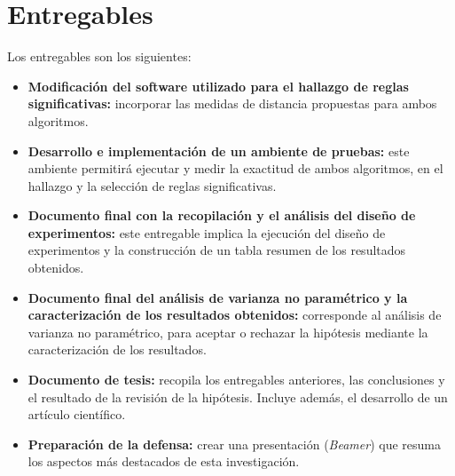 \section{\textbf{Entregables}}
Los entregables son los siguientes:
\begin{itemize}
\item \textbf{Modificaci\'on del software utilizado para el hallazgo de reglas significativas:} incorporar las medidas de distancia propuestas para ambos algoritmos.
\item \textbf{Desarrollo e implementaci\'on de un ambiente de pruebas:} este ambiente permitir\'a ejecutar y medir la exactitud de ambos algoritmos, en el hallazgo y la selecci\'on de reglas significativas.
\item \textbf{Documento final con la recopilaci\'on y el an\'alisis del dise\~no de experimentos:} este entregable implica la ejecuci\'on del dise\~no de experimentos y la construcci\'on de un tabla resumen de los resultados obtenidos. 
\item \textbf{Documento final del an\'alisis de varianza no param\'etrico y la caracterizaci\'on de los resultados obtenidos:} corresponde al an\'alisis de varianza no param\'etrico, para aceptar o rechazar la hip\'otesis mediante la caracterizaci\'on de los resultados.
\item \textbf{Documento de tesis:} recopila los entregables anteriores, las conclusiones y el resultado de la revisi\'on de la hip\'otesis. Incluye adem\'as, el desarrollo de un art\'iculo cient\'ifico.
\item \textbf{Preparaci\'on de la defensa:} crear una presentaci\'on (\textit{Beamer}) que resuma los aspectos m\'as destacados de esta investigaci\'on.
\end{itemize}